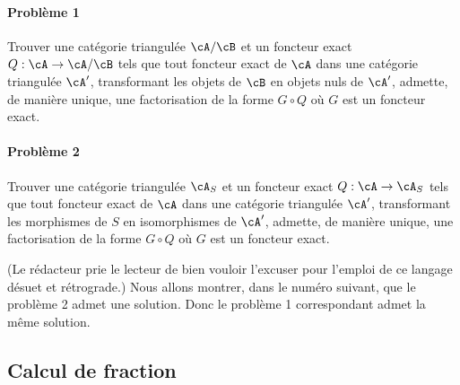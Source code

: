 \paragraph{Probl\`eme 1}
Trouver une cat\'egorie triangul\'ee $\cA/\cB$ et un foncteur exact 
$Q:\cA\to \cA/\cB$ tels que tout foncteur exact de $\cA$ dans une cat\'egorie 
triangul\'ee $\cA'$, transformant les objets de $\cB$ en objets nuls de 
$\cA'$, admette, de mani\`ere unique, une factorisation de la forme $G\circ Q$ 
o\`u $G$ est un foncteur exact. 


\paragraph{Probl\`eme 2}
Trouver une cat\'egorie triangul\'ee $\cA_S$ et un foncteur exact 
$Q:\cA\to \cA_S$ tels que tout foncteur exact de $\cA$ dans une cat\'egorie 
triangul\'ee $\cA'$, transformant les morphismes de $S$ en isomorphismes de 
$\cA'$, admette, de mani\`ere unique, une factorisation de la forme 
$G\circ Q$ o\`u $G$ est un foncteur exact. 

(Le r\'edacteur prie le lecteur de bien vouloir l'excuser pour l'emploi de ce 
langage d\'esuet et r\'etrograde.) Nous allons montrer, dans le num\'ero 
suivant, que le probl\`eme 2 admet une solution. Donc le probl\`eme 1 
correspondant admet la m\^eme solution. 










\subsection{Calcul de fraction}\label{VIII:2-3}





\subsubsection{}\label{VIII:2-3-1}

